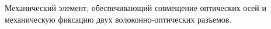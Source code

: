 Механический элемент, обеспечивающий совмещение 
оптических осей и механическую фиксацию двух 
волоконно-оптических разъемов.